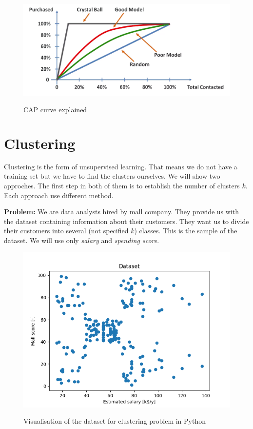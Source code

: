 \documentclass[runningheads,a4paper]{llncs}
\begin{document}
\begin{figure}[H]
\centering
\begin{center}
\includegraphics[scale=0.4]{pics/cap}
\label{uloha1:pic1}
\caption{CAP curve explained} 
\end{center}
\end{figure}


\newpage
\section{Clustering}

Clustering is the form of unsupervised learning. That means we do not have a training set but we have to find the clusters ourselves. We will show two approches. The first step in both of them is to establish the number of clusters $k$. Each approach use different method.

\textbf{Problem:} We are data analysts hired by mall company. They provide us with the dataset containing information about their customers. They want us to divide their customers into several (not specified $k$) classes. This is the sample of the dataset. We will use only \textit{salary} and \textit{spending score}.



\begin{figure}[H]
\centering
\begin{center}
\includegraphics[scale=0.8]{pics/k_means_data}
\label{uloha1:pic1}
\caption{Visualisation of the dataset for clustering problem in Python} 
\end{center}
\end{figure}
\end{document}
